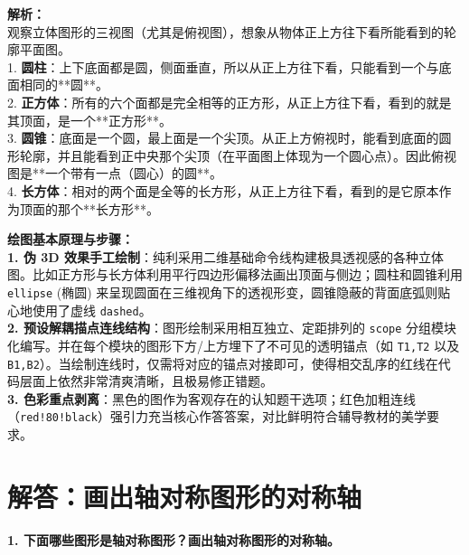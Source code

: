 \documentclass[12pt, a4paper]{ctexrep}
\begin{document}
\vspace{0.8cm}

{\small\color{gray}
\textbf{解析：}\\
观察立体图形的三视图（尤其是俯视图），想象从物体正上方往下看所能看到的轮廓平面图。\\
1. \textbf{圆柱}：上下底面都是圆，侧面垂直，所以从正上方往下看，只能看到一个与底面相同的**圆**。\\
2. \textbf{正方体}：所有的六个面都是完全相等的正方形，从正上方往下看，看到的就是其顶面，是一个**正方形**。\\
3. \textbf{圆锥}：底面是一个圆，最上面是一个尖顶。从正上方俯视时，能看到底面的圆形轮廓，并且能看到正中央那个尖顶（在平面图上体现为一个圆心点）。因此俯视图是**一个带有一点（圆心）的圆**。\\
4. \textbf{长方体}：相对的两个面是全等的长方形，从正上方往下看，看到的是它原本作为顶面的那个**长方形**。
}

\vspace{0.6cm}

{\small\color{blue!70!black}
\textbf{绘图基本原理与步骤：}\\
\textbf{1. 伪 3D 效果手工绘制}：纯利采用二维基础命令线构建极具透视感的各种立体图。比如正方形与长方体利用平行四边形偏移法画出顶面与侧边；圆柱和圆锥利用 \texttt{ellipse} (椭圆) 来呈现圆面在三维视角下的透视形变，圆锥隐蔽的背面底弧则贴心地使用了虚线 \texttt{dashed}。\\
\textbf{2. 预设解耦描点连线结构}：图形绘制采用相互独立、定距排列的 \texttt{scope} 分组模块化编写。并在每个模块的图形下方/上方埋下了不可见的透明锚点（如 \texttt{T1,T2} 以及 \texttt{B1,B2}）。当绘制连线时，仅需将对应的锚点对接即可，使得相交乱序的红线在代码层面上依然非常清爽清晰，且极易修正错题。\\
\textbf{3. 色彩重点剥离}：黑色的图作为客观存在的认知题干选项；红色加粗连线（\texttt{red!80!black}）强引力充当核心作答答案，对比鲜明符合辅导教材的美学要求。
}


\newpage
\section{解答：画出轴对称图形的对称轴}

\vspace{0.4cm}

\noindent\textbf{1. 下面哪些图形是轴对称图形？画出轴对称图形的对称轴。}

\vspace{1.2cm}
\end{document}
